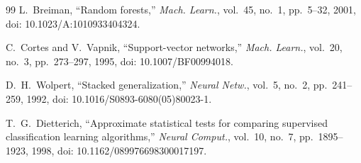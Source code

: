 \documentclass[conference]{IEEEtran}
\begin{document}
\begin{thebibliography}{99}
L.~Breiman, ``Random forests,'' \textit{Mach. Learn.}, vol.~45, no.~1, pp.~5--32, 2001, doi: 10.1023/A:1010933404324.

C.~Cortes and V.~Vapnik, ``Support-vector networks,'' \textit{Mach. Learn.}, vol.~20, no.~3, pp.~273--297, 1995, doi: 10.1007/BF00994018.

D.~H.~Wolpert, ``Stacked generalization,'' \textit{Neural Netw.}, vol.~5, no.~2, pp.~241--259, 1992, doi: 10.1016/S0893-6080(05)80023-1.

T.~G.~Dietterich, ``Approximate statistical tests for comparing supervised classification learning algorithms,'' \textit{Neural Comput.}, vol.~10, no.~7, pp.~1895--1923, 1998, doi: 10.1162/089976698300017197.

\end{thebibliography}
\end{document}
